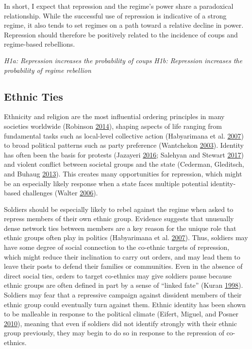 \documentclass[12pt,]{article}
\theoremstyle{definition}
\theoremstyle{definition}
\theoremstyle{definition}
\theoremstyle{remark}
\begin{document}
In short, I expect that repression and the regime's power share a
paradoxical relationship. While the successful use of repression is
indicative of a strong regime, it also tends to set regimes on a path
toward a relative decline in power. Repression should therefore be
positively related to the incidence of coups and regime-based
rebellions.

\noindent \textit{H1a: Repression increases the probability of coups}
\noindent \textit{H1b: Repression increases the probability of regime rebellion}

\hypertarget{ethnic-ties}{%
\subsection{Ethnic Ties}\label{ethnic-ties}}

Ethnicity and religion are the most influential ordering principles in
many societies worldwide (Robinson
\protect\hyperlink{ref-Robinson2014}{2014}), shaping aspects of life
ranging from fundamental tasks such as local-level collective action
(Habyarimana et al. \protect\hyperlink{ref-Habyarimana2007}{2007}) to
broad political patterns such as party preference (Wantchekon
\protect\hyperlink{ref-Wantchekon2003}{2003}). Identity has often been
the basis for protests (Jazayeri
\protect\hyperlink{ref-Jazayeri2016}{2016}; Salehyan and Stewart
\protect\hyperlink{ref-Salehyan2017}{2017}) and violent conflict between
societal groups and the state (Cederman, Gleditsch, and Buhaug
\protect\hyperlink{ref-Cederman2013a}{2013}). This creates many
opportunities for repression, which might be an especially likely
response when a state faces multiple potential identity-based challenges
(Walter \protect\hyperlink{ref-Walter2006a}{2006}).

Soldiers should be especially likely to rebel against the regime when
asked to repress members of their own ethnic group. Evidence suggests
that unusually dense network ties between members are a key reason for
the unique role that ethnic groups often play in politics (Habyarimana
et al. \protect\hyperlink{ref-Habyarimana2007}{2007}). Thus, soldiers
may have some degree of social connection to the co-ethnic targets of
repression, which might reduce their inclination to carry out orders,
and may lead them to leave their posts to defend their families or
communities. Even in the absence of direct social ties, orders to target
co-ethnics may give soldiers pause because ethnic groups are often
defined in part by a sense of ``linked fate'' (Kuran
\protect\hyperlink{ref-Kuran1998}{1998}). Soldiers may fear that a
repressive campaign against dissident members of their ethnic group
could eventually turn against them. Ethnic identity has been shown to be
malleable in response to the political climate (Eifert, Miguel, and
Posner \protect\hyperlink{ref-Eifert2010}{2010}), meaning that even if
soldiers did not identify strongly with their ethnic group previously,
they may begin to do so in response to the repression of co-ethnics.
\end{document}
